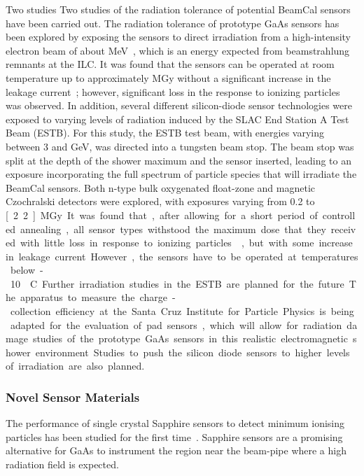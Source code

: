 Two studies Two studies of the radiation tolerance of potential BeamCal sensors have been carried out. The
radiation tolerance of prototype GaAs sensors has been explored by exposing the sensors
to direct irradiation from a high-intensity electron beam of about \unit[10]{MeV}~\cite{sdalinac},
which is an energy expected from beamstrahlung
remnants at the ILC.
It was found that the sensors can be operated at room temperature up
to approximately \unit[1]{MGy} without a significant increase in the
leakage current~\cite{1748-0221-7-11-P11022}; however, significant loss in the response to ionizing particles was observed.
In addition, several different silicon-diode sensor technologies were exposed to varying levels
of radiation induced by the SLAC End Station A Test Beam (ESTB).
For this study, the ESTB test beam, with energies
varying between 3 and \unit[11]{GeV}, was directed into a tungsten beam stop.
The beam stop was split at the depth of the shower maximum
and the sensor inserted,
leading to an exposure incorporating the full spectrum of particle species that will
irradiate the BeamCal sensors. Both n-type bulk oxygenated float-zone and magnetic Czochralski
detectors were explored, with exposures varying from 0.2 to \unit[2.2]{MGy}.
It was found that, after allowing for a short period of controlled annealing,
all sensor types withstood the maximum dose that they received with little loss in response
to ionizing particles~\cite{2014arXiv1402.2692B}, but with some increase in leakage current.
However, the sensors have to be operated at temperatures below -10 \textdegree C.
Further irradiation studies in the ESTB are planned for the future.
The apparatus to measure the charge-collection efficiency  at the Santa Cruz Institute
for Particle Physics is being adapted for the evaluation of pad sensors, which will allow for radiation
damage studies of the prototype GaAs sensors in this realistic electromagnetic shower environment.
Studies to push the silicon diode sensors to higher levels of irradiation are also planned.

\subsubsection{Novel Sensor Materials}

The performance of single crystal Sapphire sensors to detect minimum ionising particles has been studied for the
first time~\cite{1748-0221-10-08-P08008}. Sapphire sensors are a promising alternative for GaAs to instrument
the region near the beam-pipe where a high radiation field is expected.

